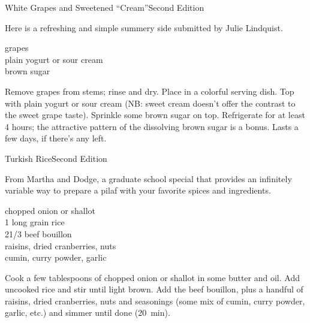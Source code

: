 
\begin{entry}{White Grapes and Sweetened ``Cream''}{Second Edition}

\begin{open}
  Here is a refreshing and simple summery side submitted by Julie Lindquist.
\end{open}
\begin{ingredients}
    grapes\\
    plain yogurt or sour cream\\
    brown sugar
\end{ingredients}
Remove grapes from stems; rinse and dry. Place in a colorful serving dish. Top
with plain yogurt or sour cream (NB: sweet cream doesn't offer the contrast to
the sweet grape taste). Sprinkle some brown sugar on top. Refrigerate for at
least 4 hours; the attractive pattern of the dissolving brown sugar is a
bonus. Lasts a few days, if there’s any left.
\end{entry}

\begin{entry}{Turkish Rice}{Second Edition}

\begin{open}
    From Martha and Dodge, a graduate school special that provides an infinitely
    variable way to prepare a pilaf with your favorite spices and ingredients.
\end{open}
\begin{ingredients}
    chopped onion or shallot\\
    \SI{1}{\cup} long grain rice\\
    2\SI{1/3}{\cup} beef bouillon\\
    raisins, dried cranberries, nuts\\
    cumin, curry powder, garlic
\end{ingredients}
Cook a few tablespoons of chopped onion or shallot in some butter and oil. Add
uncooked rice and stir until light brown. Add the beef bouillon, plus a handful
of raisins, dried cranberries, nuts and seasonings (some mix of cumin, curry
powder, garlic, etc.) and simmer until done (\SI{20}{\minute}).
\end{entry}

